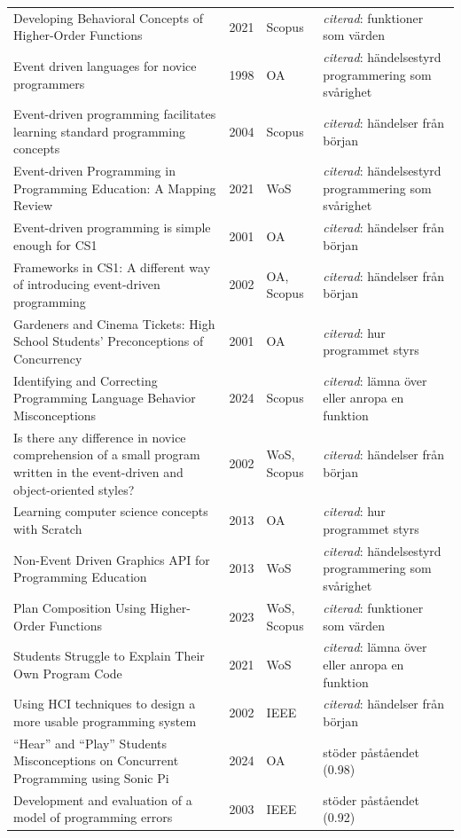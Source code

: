 \begin{longtable}{@{}%
  >{\raggedright\arraybackslash}p{}c%
  >{\raggedright\arraybackslash}p{}%
  >{\raggedright\arraybackslash}p{}@{}}
Developing Behavioral Concepts of Higher-Order Functions & 2021 & Scopus & \emph{citerad}: funktioner som värden \\
Event driven languages for novice programmers & 1998 & OA & \emph{citerad}: händelsestyrd programmering som svårighet \\
Event-driven programming facilitates learning standard programming concepts & 2004 & Scopus & \emph{citerad}: händelser från början \\
Event-driven Programming in Programming Education: A Mapping Review & 2021 & WoS & \emph{citerad}: händelsestyrd programmering som svårighet \\
Event-driven programming is simple enough for CS1 & 2001 & OA & \emph{citerad}: händelser från början \\
Frameworks in CS1: A different way of introducing event-driven programming & 2002 & OA, Scopus & \emph{citerad}: händelser från början \\
Gardeners and Cinema Tickets: High School Students' Preconceptions of Concurrency & 2001 & OA & \emph{citerad}: hur programmet styrs \\
Identifying and Correcting Programming Language Behavior Misconceptions & 2024 & Scopus & \emph{citerad}: lämna över eller anropa en funktion \\
Is there any difference in novice comprehension of a small program written in the event-driven and object-oriented styles? & 2002 & WoS, Scopus & \emph{citerad}: händelser från början \\
Learning computer science concepts with Scratch & 2013 & OA & \emph{citerad}: hur programmet styrs \\
Non-Event Driven Graphics API for Programming Education & 2013 & WoS & \emph{citerad}: händelsestyrd programmering som svårighet \\
Plan Composition Using Higher-Order Functions & 2023 & WoS, Scopus & \emph{citerad}: funktioner som värden \\
Students Struggle to Explain Their Own Program Code & 2021 & WoS & \emph{citerad}: lämna över eller anropa en funktion \\
Using HCI techniques to design a more usable programming system & 2002 & IEEE & \emph{citerad}: händelser från början \\
\enquote{Hear} and \enquote{Play} Students Misconceptions on Concurrent Programming using Sonic Pi & 2024 & OA & stöder påståendet (0.98) \\
Development and evaluation of a model of programming errors & 2003 & IEEE & stöder påståendet (0.92) \\

\end{longtable}

